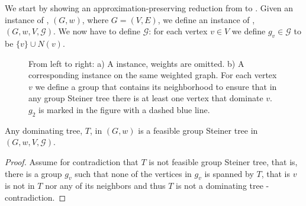 We start by showing an approximation-preserving reduction from \Prob{} to
\ProbGroup{}.
Given an instance of \Prob{}, $(G, w)$, where $G = (V, E)$, 
we define an instance of \ProbGroup{},
$(G, w, V, \mathcal{G})$.
We now have to define $\mathcal{G}$: for each vertex $v \in V$ we define 
$g_v \in \mathcal{G}$ to be $\{v\} \cup N(v)$.

\begin{figure}
\begin{center}

\end{center}
\caption{\label{fig:prob-leq-group}
From left to right:
a) A \Prob{} instance, weights are omitted.
b) A corresponding \ProbGroup{} instance on the same weighted graph.
For each vertex $v$ we define a group
that contains its neighborhood to ensure that in any group Steiner tree there is at least
one vertex that dominate $v$.
$g_2$ is marked in the figure with a dashed blue line.  
}
\end{figure}

\begin{claim}
Any dominating tree, $T$, in $(G, w)$ is a feasible group Steiner tree in $(G, w, V, \mathcal{G})$.
\end{claim}

\begin{proof}
Assume for contradiction that $T$ is not feasible group Steiner tree, that is, there is 
a group $g_v$ such that none of the vertices in $g_v$ is spanned by $T$, that is $v$
is not in $T$ nor any of its neighbors and thus $T$ is not a dominating tree - contradiction. 
\end{proof}
 